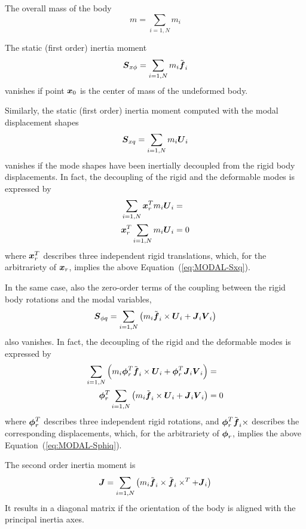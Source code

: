 The overall mass of the body
\begin{equation}
	m = \sum_{i=1,N} m_i
\end{equation}

The static (first order) inertia moment
\begin{equation}
	\boldsymbol{S}_{x\phi} = \sum_{i=1,N} m_i \tilde{\boldsymbol{f}}_i
\end{equation}
vanishes if point $\boldsymbol{x}_0$ is the center of mass of the undeformed body.

Similarly, the static (first order) inertia moment computed with 
the modal displacement shapes
\begin{equation}
	\label{eq:MODAL-Sxq}
	\boldsymbol{S}_{xq} = \sum_{i=1,N} m_i \boldsymbol{U}_i
\end{equation}
vanishes if the mode shapes have been inertially decoupled
from the rigid body displacements.
In fact, the decoupling of the rigid and the deformable modes
is expressed by
\begin{align}
	\sum_{i=1,N} \boldsymbol{x}_r^T m_i \boldsymbol{U}_i &= \nonumber \\
	\boldsymbol{x}_r^T \sum_{i=1,N} m_i \boldsymbol{U}_i &= 0
\end{align}
where $\boldsymbol{x}_r^T$ describes three independent rigid translations,
which, for the arbitrariety of $\boldsymbol{x}_r$,
implies the above Equation~(\ref{eq:MODAL-Sxq}).

In the same case, also the zero-order terms of the coupling
between the rigid body rotations and the modal variables,
\begin{equation}
	\label{eq:MODAL-Sphiq}
	\boldsymbol{S}_{\phi q} = \sum_{i=1,N} \left( 
		m_i \tilde{\boldsymbol{f}}_i \times \boldsymbol{U}_i
		+ \boldsymbol{J}_i \boldsymbol{V}_i
	 \right)
\end{equation}
also vanishes.
In fact, the decoupling of the rigid and the deformable modes
is expressed by
\begin{align}
	\sum_{i=1,N} \left( 
		m_i \boldsymbol{\phi}_r^T \tilde{\boldsymbol{f}}_i \times \boldsymbol{U}_i
		+ \boldsymbol{\phi}_r^T \boldsymbol{J}_i \boldsymbol{V}_i
	 \right) &= \nonumber \\
	\boldsymbol{\phi}_r^T \sum_{i=1,N} \left( 
		m_i \tilde{\boldsymbol{f}}_i \times \boldsymbol{U}_i
		+ \boldsymbol{J}_i \boldsymbol{V}_i
	 \right) &= 0
\end{align}
where $\boldsymbol{\phi}_r^T$ describes three independent rigid rotations,
and $\boldsymbol{\phi}_r^T \tilde{\boldsymbol{f}}_i \times$ describes the corresponding
displacements, which, for the arbitrariety of $\boldsymbol{\phi}_r$,
implies the above Equation~(\ref{eq:MODAL-Sphiq}).


The second order inertia moment is
\begin{equation}
	\boldsymbol{J} = \sum_{i=1,N} \left( 
		m_i \tilde{\boldsymbol{f}}_i \times \tilde{\boldsymbol{f}}_i\times^T
		+ \boldsymbol{J}_i
	 \right)
\end{equation}
It results in a diagonal matrix if the orientation of the body
is aligned with the principal inertia axes.

